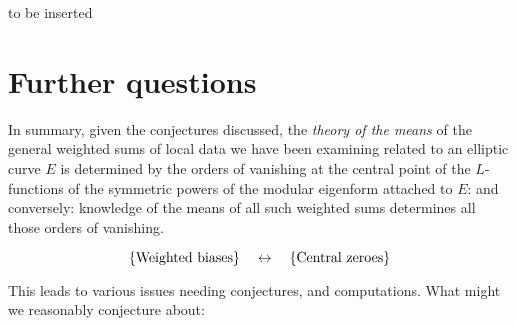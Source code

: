 \documentclass[11pt]{article}
\theoremstyle{plain}
\theoremstyle{definition}
\numberwithin{equation}{section}
\numberwithin{figure}{section}
\numberwithin{table}{section}
\begin{document}
\begin{itemize}
\centerline{to be inserted}\end{itemize}
\vskip10pt
\section{Further  questions}
\vskip10pt

 In summary, given the conjectures discussed, the {\it theory of the means} of the general weighted sums of local data we have been examining related to an elliptic curve $E$ is determined by the orders of vanishing at the central point of the $L$-functions of the symmetric powers of the modular eigenform attached to $E$: and conversely: knowledge of the means of all such weighted sums determines all those orders of vanishing.


 \vskip20pt $$\{{\rm Weighted\ biases}\} \ \ \ \leftrightarrow\ \ \  \{{\rm Central\ zeroes}\}$$


This leads to  various issues needing conjectures, and computations. What might we reasonably conjecture about:
\end{document}

